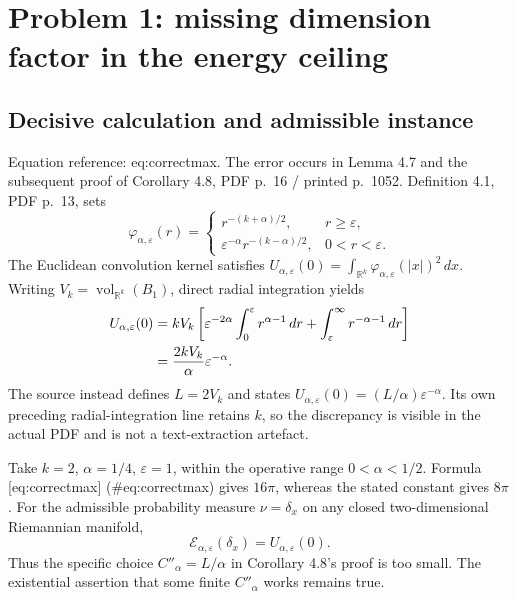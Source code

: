 \documentclass[10pt]{article}
\begin{document}
\section*{Problem 1: missing dimension factor in the energy ceiling}
\subsection*{Decisive calculation and admissible instance}
Equation reference: eq:correctmax. The error occurs in Lemma 4.7 and the subsequent proof of Corollary 4.8, PDF p. 16 / printed p. 1052. Definition 4.1, PDF p. 13, sets \[\varphi_{\alpha,\varepsilon}(r)=
 \begin{cases}
 r^{-(k+\alpha)/2},&r\ge\varepsilon,\\
 \varepsilon^{-\alpha}r^{-(k-\alpha)/2},&0<r<\varepsilon.
 \end{cases}\] The Euclidean convolution kernel satisfies \(U_{\alpha,\varepsilon}(0)=\int_{\mathbb R^k}
\varphi_{\alpha,\varepsilon}(|x|)^2\,dx\). Writing \(V_k=\operatorname{vol}_{\mathbb R^k}(B_1)\), direct radial integration yields \[\begin{aligned}
 U_{\alpha,\varepsilon}(0)
 &=kV_k\left[
 \varepsilon^{-2\alpha}\int_0^\varepsilon r^{\alpha-1}\,dr
 +\int_\varepsilon^\infty r^{-\alpha-1}\,dr\right]\notag\\
 &=\frac{2kV_k}{\alpha}\varepsilon^{-\alpha}. \end{aligned}\] The source instead defines \(L=2V_k\) and states \(U_{\alpha,\varepsilon}(0)=(L/\alpha)\varepsilon^{-\alpha}\). Its own preceding radial-integration line retains \(k\), so the discrepancy is visible in the actual PDF and is not a text-extraction artefact.\par
Take \(k=2\), \(\alpha=1/4\), \(\varepsilon=1\), within the operative range \(0<\alpha<1/2\). Formula [eq:correctmax] (\#eq:correctmax) gives \(16\pi\), whereas the stated constant gives \(8\pi\). For the admissible probability measure \(\nu=\delta_x\) on any closed two-dimensional Riemannian manifold, \[\mathcal E_{\alpha,\varepsilon}(\delta_x)=U_{\alpha,\varepsilon}(0).\] Thus the specific choice \(C''_\alpha=L/\alpha\) in Corollary 4.8’s proof is too small. The existential assertion that some finite \(C''_\alpha\) works remains true.\par
\end{document}
